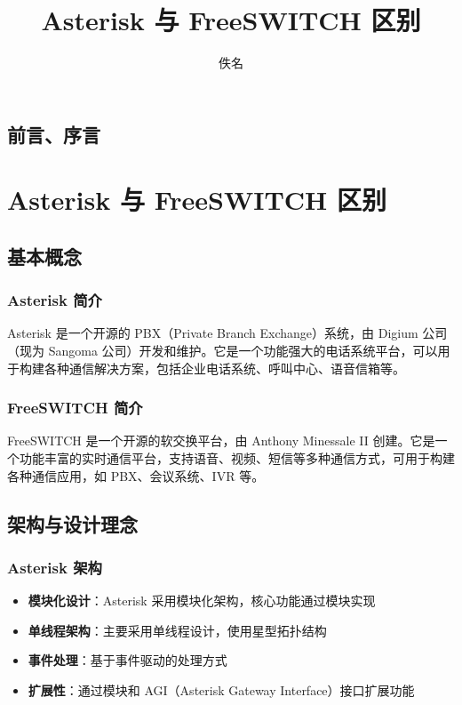 \documentclass[12pt,UTF8]{ctexbook}
\title{\heiti\zihao{0} Asterisk 与 FreeSWITCH 区别}
\author{佚名}
\date{}
\begin{document}
\maketitle
\tableofcontents

\frontmatter
\chapter{前言、序言}

\mainmatter

\part{Asterisk 与 FreeSWITCH 区别}

\chapter{基本概念}
\section{Asterisk 简介}

Asterisk 是一个开源的 PBX（Private Branch Exchange）系统，由 Digium 公司（现为 Sangoma 公司）开发和维护。它是一个功能强大的电话系统平台，可以用于构建各种通信解决方案，包括企业电话系统、呼叫中心、语音信箱等。

\section{FreeSWITCH 简介}

FreeSWITCH 是一个开源的软交换平台，由 Anthony Minessale II 创建。它是一个功能丰富的实时通信平台，支持语音、视频、短信等多种通信方式，可用于构建各种通信应用，如 PBX、会议系统、IVR 等。

\chapter{架构与设计理念}
\section{Asterisk 架构}

\begin{itemize}
  \item \textbf{模块化设计}：Asterisk 采用模块化架构，核心功能通过模块实现
  \item \textbf{单线程架构}：主要采用单线程设计，使用星型拓扑结构
  \item \textbf{事件处理}：基于事件驱动的处理方式
  \item \textbf{扩展性}：通过模块和 AGI（Asterisk Gateway Interface）接口扩展功能
\end{itemize}
\end{document}

